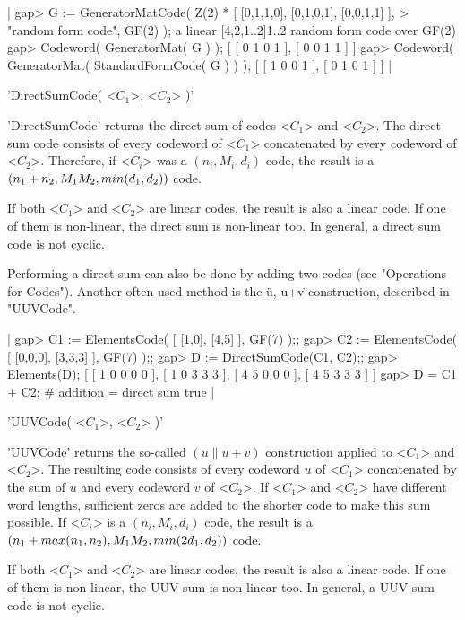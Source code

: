 |    gap> G := GeneratorMatCode( Z(2) * [ [0,1,1,0], [0,1,0,1], [0,0,1,1] ],
    > "random form code", GF(2) );
    a linear [4,2,1..2]1..2 random form code over GF(2)
    gap> Codeword( GeneratorMat( G ) );
    [ [ 0 1 0 1 ], [ 0 0 1 1 ] ]
    gap> Codeword( GeneratorMat( StandardFormCode( G ) ) );
    [ [ 1 0 0 1 ], [ 0 1 0 1 ] ] |


'DirectSumCode( <$C_1$>, <$C_2$> )'

'DirectSumCode' returns the direct sum  of codes <$C_1$> and <$C_2$>. The
direct sum  code  consists of every codeword   of <$C_1$> concatenated by
every codeword  of <$C_2$>. Therefore, if  <$C_i$> was  a $(n_i,M_i,d_i)$
code, the result is a $(n_1+n_2,M_1\*M_2,min(d_1,d_2))$ code.

If both <$C_1$> and <$C_2$> are linear codes, the result is also a linear
code. If one of them is non-linear, the  direct sum is non-linear too. In
general, a direct sum code is not cyclic.

Performing  a direct   sum can also  be done   by adding two   codes (see
"Operations   for  Codes").  Another  often    used method  is  the  \"u,
u+v\"-construction, described in "UUVCode".

|    gap> C1 := ElementsCode( [ [1,0], [4,5] ], GF(7) );;
    gap> C2 := ElementsCode( [ [0,0,0], [3,3,3] ], GF(7) );;
    gap> D := DirectSumCode(C1, C2);;
    gap> Elements(D);
    [ [ 1 0 0 0 0 ], [ 1 0 3 3 3 ], [ 4 5 0 0 0 ], [ 4 5 3 3 3 ] ]
    gap> D = C1 + C2;   # addition = direct sum
    true |


'UUVCode( <$C_1$>, <$C_2$> )'

'UUVCode'  returns  the  so-called  $(u\|u+v)$ construction   applied  to
<$C_1$> and <$C_2$>. The resulting code consists of every codeword $u$ of
<$C_1$> concatenated   by  the sum   of  $u$ and  every   codeword $v$ of
<$C_2$>.  If <$C_1$> and <$C_2$> have  different word lengths, sufficient
zeros are added to the shorter code to make this sum possible. If <$C_i$>
is  a        $(n_i,M_i,d_i)$   code,          the  result    is         a
$(n_1+max(n_1,n_2),M_1\*M_2,min(2\*d_1,d_2))$ code.

If both <$C_1$> and <$C_2$> are linear codes, the result is also a linear
code. If one  of them is non-linear, the  UUV  sum is non-linear too.  In
general, a UUV sum code is not cyclic.

